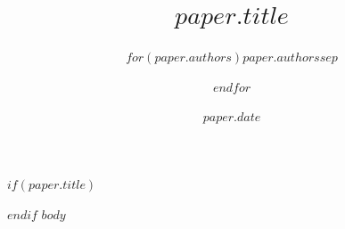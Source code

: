 \documentclass{article}
\title{$paper.title$}
\author{$for(paper.authors)$$paper.authors$$sep$ \and $endfor$}
\date{$paper.date$}
\begin{document}
$if(paper.title)$\maketitle$endif$
$body$
\end{document}
